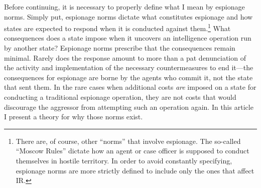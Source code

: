 \documentclass[14pt]{extarticle}
\begin{document}
Before continuing, it is necessary to properly define what I mean by espionage norms. Simply put, espionage norms dictate what constitutes espionage and how states are expected to respond when it is conducted against them.\footnote{There are, of course, other \enquote{norms} that involve espionage. The so-called \enquote{Moscow Rules} dictate how an agent or case officer is supposed to conduct themselves in hostile territory. In order to avoid constantly specifying, espionage norms are more strictly defined to include only the ones that affect IR.} What consequences does a state impose when it uncovers an intelligence operation run by another state? Espionage norms prescribe that the consequences remain minimal. Rarely does the response amount to more than a pat denunciation of the activity and implementation of the necessary countermeasures to end it---the consequences for espionage are borne by the agents who commit it, not the state that sent them. In the rare cases when additional costs \emph{are} imposed on a state for conducting a traditional espionage operation, they are not costs that would discourage the aggressor from attempting such an operation again. In this article I present a theory for why those norms exist.
\end{document}

